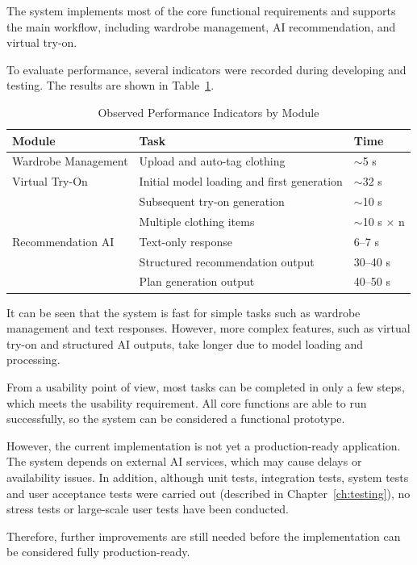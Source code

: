 The system implements most of the core functional requirements and supports the main workflow, including wardrobe management, AI recommendation, and virtual try-on.

To evaluate performance, several indicators were recorded during developing and testing. The results are shown in Table~\ref{tab:performance}.

\begin{table}[h]
\centering
\caption{Observed Performance Indicators by Module}
\begin{tabular}{lll}
\toprule
\textbf{Module} & \textbf{Task} & \textbf{Time} \\
\midrule

Wardrobe Management 
& Upload and auto-tag clothing 
& $\sim$5 s \\

\addlinespace

Virtual Try-On 
& Initial model loading and first generation 
& $\sim$32 s \\
& Subsequent try-on generation 
& $\sim$10 s \\
& Multiple clothing items 
& $\sim$10 s $\times$ n \\

\addlinespace

Recommendation AI 
& Text-only response 
& 6--7 s \\
& Structured recommendation output 
& 30--40 s \\
& Plan generation output 
& 40--50 s \\

\bottomrule
\end{tabular}
\label{tab:performance}
\end{table}

It can be seen that the system is fast for simple tasks such as wardrobe management and text responses. However, more complex features, such as virtual try-on and structured AI outputs, take longer due to model loading and processing.

From a usability point of view, most tasks can be completed in only a few steps, which meets the usability requirement. All core functions are able to run successfully, so the system can be considered a functional prototype.

However, the current implementation is not yet a production-ready application. The system depends on external AI services, which may cause delays or availability issues. In addition, although unit tests, integration tests, system tests and user acceptance tests were carried out (described in Chapter~\ref{ch:testing}), no stress tests or large-scale user tests have been conducted.

Therefore, further improvements are still needed before the implementation can be considered fully production-ready.